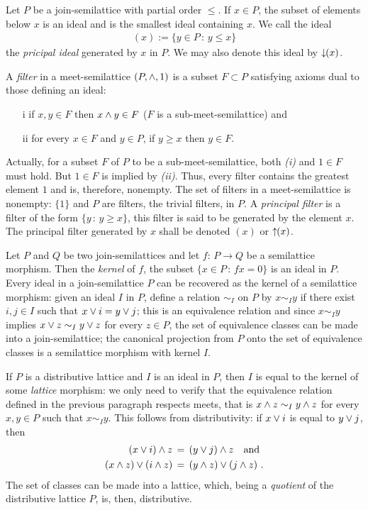 Let $P$ be a join-semilattice with partial order $\leq$. If $x\in P$, the
subset of elements below $x$ is an ideal and is the smallest ideal
containing $x$. We call the ideal
\begin{align*}
	(x):=\{y\in P\,:\,y\leq x\}
\end{align*}
%
the \emph{pricipal ideal} generated by $x$ in $P$. We may also denote this
ideal by $\downarrow\!\!(x)$.

A \emph{filter} in a meet-semilattice $(P,\wedge,1)$ is a subset
$F\subset P$ satisfying axioms dual to those defining an ideal:
\begin{itemize}
	\item[i] if $x,y\in F$ then $x\wedge y\in F$ ($F$ is a
		sub-meet-semilattice) and
	\item[ii] for every $x\in F$ and $y\in P$, if $y\geq x$ then $y\in F$.
\end{itemize}
%
Actually, for a subset $F$ of $P$ to be a sub-meet-semilattice, both
\textit{(i)} and $1\in F$ must hold. But $1\in F$ is implied by \textit{(ii)}.
Thus, every filter contains the greatest element $1$ and is, therefore,
nonempty. The set of filters in a meet-semilattice is nonempty: $\{1\}$ and
$P$ are filters, the trivial filters, in $P$. A \emph{principal filter}
is a filter of the form $\{y\,:\,y\geq x\}$, this filter is said to be
generated by the element $x$. The principal filter generated by $x$ shall
be denoted $(x)$ or $\uparrow\!\!(x)$.

\begin{remarkKerIsIdealIsKer}
	Let $P$ and $Q$ be two join-semilattices and let $f:\,P\rightarrow Q$
	be a semilattice morphism. Then the \emph{kernel} of $f$,
	the subset $\{x\in P\,:\,fx=0\}$ is an ideal in $P$. Every ideal
	in a join-semilattice $P$ can be recovered as the kernel of a
	semilattice morphism: given an ideal $I$ in $P$, define a relation
	$\sim_{I}$ on $P$ by $x\sim_{I} y$ if there exist $i,j\in I$ such
	that $x\vee i=y\vee j$; this is an equivalence relation and
	since $x\sim_{I}y$ implies $x\vee z\sim_{I}y\vee z$ for
	every $z\in P$, the set of equivalence classes can be made into a
	join-semilattice; the canonical projection from $P$ onto the set
	of equivalence classes is a semilattice morphism with kernel $I$.

	If $P$ is a distributive lattice and $I$ is an ideal in $P$,
	then $I$ is equal to the kernel of some \emph{lattice} morphism:
	we only need to verify that the equivalence relation defined in the
	previous paragraph respects meets, that is
	$x\wedge z\sim_{I}y\wedge z$ for every $x,y\in P$ such that
	$x\sim_{I}y$. This follows from distributivity: if $x\vee i$
	is equal to $y\vee j$, then
	\begin{align*}
		(x\vee i)\wedge z & \,=\, (y\vee j)\wedge z
			\quad\text{and} \\
		(x\wedge z)\vee (i\wedge z) & \,=\,
			(y\wedge z)\vee (j\wedge z)
		\text{ .}
	\end{align*}
	The set of classes can be made into a lattice, which, being a
	\emph{quotient} of the distributive lattice $P$, is, then,
	distributive.
\end{remarkKerIsIdealIsKer}


